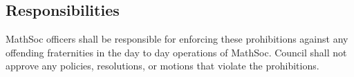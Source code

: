 \subsection{Responsibilities}
MathSoc officers shall be responsible for enforcing these prohibitions against any offending fraternities in the day to day operations of MathSoc. Council shall not approve any policies, resolutions, or motions that violate the prohibitions.

